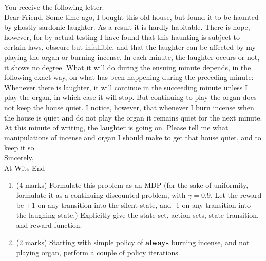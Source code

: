 \documentclass[addpoints,12pt,solution]{exam}
\begin{document}
\begin{questions}
\begin{enumerate}[label=(\alph*)]
            \begin{solution}

            \end{solution}

        \end{enumerate}

         You receive the following letter:\\
        Dear Friend, Some time ago, I bought this old house, but found it to be haunted by
        ghostly sardonic laughter. As a result it is hardly habitable. There is hope, however,
        for by actual testing I have found that this haunting is subject to certain laws, obscure
        but infallible, and that the laughter can be affected by my playing the organ or burning
        incense. In each minute, the laughter occurs or not, it shows no degree. What it will
        do during the ensuing minute depends, in the following exact way, on what has been
        happening during the preceding minute: Whenever there is laughter, it will continue in
        the succeeding minute unless I play the organ, in which case it will stop. But continuing
        to play the organ does not keep the house quiet. I notice, however, that whenever I
        burn incense when the house is quiet and do not play the organ it remains quiet for the
        next minute. At this minute of writing, the laughter is going on. Please tell me what
        manipulations of incense and organ I should make to get that house quiet, and to keep
        it so.\\
        Sincerely,\\
        At Wits End

        \begin{enumerate}[label=(\alph*)]

            \item (4 marks) Formulate this problem as an MDP (for the sake of uniformity, formulate it as a
            continuing discounted problem, with $\gamma= 0.9$. Let the reward be +1 on any transition
            into the silent state, and -1 on any transition into the laughing state.) Explicitly give the
            state set, action sets, state transition, and reward function.

            \begin{solution}


            \end{solution}

            \item (2 marks) Starting with simple policy of \textbf{always} burning incense, and not playing organ, perform a couple of policy iterations.


\end{enumerate}
\end{questions}
\end{document}
